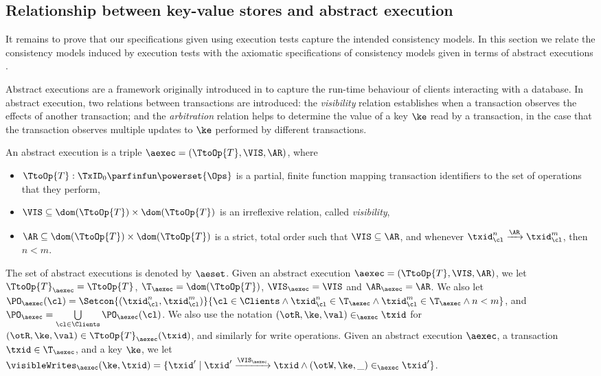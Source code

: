 \subsection{Relationship between key-value stores and abstract execution}
\label{sec:encoding-kv-to-aexec}
It remains to prove that our specifications given using execution tests 
capture the intended consistency models. 
In this section we relate the consistency models induced by execution tests with 
the axiomatic specifications of consistency models given in terms of abstract executions 
\cite{framework-concur,laws}. 

Abstract executions are a framework originally introduced in \cite{ev-transactions} 
to capture the run-time behaviour of clients interacting with a database. 
In abstract execution, two relations between transactions are introduced: 
the \emph{visibility} relation establishes when a transaction observes the effects of another transaction; 
and the \emph{arbitration} relation helps to determine the value of a key $\ke$ read by a transaction, 
in the case that the transaction observes multiple updates to $\ke$ performed by different transactions. 

\begin{definition}
\label{def:absexec}
\label{def:aexec}
An abstract execution is a triple $\aexec = (\TtoOp{T}, \VIS, \AR)$, where 
\begin{itemize}
    \item $\TtoOp{T}: \TxID_{0} \parfinfun \powerset{\Ops}$ is a partial, 
finite function mapping transaction identifiers to the set of operations that they perform,
\item $\VIS \subseteq \dom(\TtoOp{T}) \times \dom(\TtoOp{T})$ is an irreflexive relation, 
called \emph{visibility}, 
\item $\AR \subseteq \dom(\TtoOp{T}) \times \dom(\TtoOp{T})$ is a strict, total order 
such that $\VIS \subseteq \AR$, and whenever $\txid_{\cl}^{n} \xrightarrow{\AR} 
\txid_{\cl}^{m}$, then $n < m$.
\end{itemize} 
\end{definition}

The set of abstract executions is denoted by $\aeset$.
Given an abstract execution $\aexec = (\TtoOp{T}, \VIS, \AR)$, we let 
$\TtoOp{T}_{\aexec} = \TtoOp{T}$, $\T_{\aexec} = \dom(\TtoOp{T})$, $\VIS_{\aexec} = \VIS$ 
and $\AR_{\aexec} = \AR$. We also let $\PO_{\aexec}(\cl) = \Setcon{(\txid_{\cl}^{n}, \txid_{\cl}^{m})}{ \cl \in \Clients 
\wedge \txid_{\cl}^{n} \in \T_{\aexec} \wedge \txid_{\cl}^{m} \in \T_{\aexec} \wedge n < m}$, and 
$\PO_{\aexec} = \bigcup\limits_{\cl \in \Clients} \PO_{\aexec}(\cl)$.
We also use the notation $(\otR, \ke, \val) \in_{\aexec} \txid$ for $(\otR, \ke, \val) \in \TtoOp{T}_{\aexec}(\txid)$, 
and similarly for write operations. 
Given an abstract execution $\aexec$, a transaction $\txid \in \T_{\aexec}$, and a key $\ke$, 
we let $\visibleWrites_{\aexec}(\ke, \txid) = \{ \txid' \mid \txid' \xrightarrow{\VIS_{\aexec}} \txid \wedge 
(\otW, \ke, \_) \in_{\aexec} \txid'\}$.


